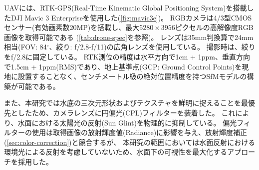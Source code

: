 UAVには、RTK-GPS(Real-Time Kinematic Global Positioning System)を搭載したDJI Mavic 3 Enterprise\cite{DJI-Mavic-3-Enterprise}を使用した(\cref{fig:mavic3e})。
RGBカメラは4/3型CMOSセンサー(有効画素数20MP)を搭載し、最大$5280 \times 3956$ピクセルの高解像度RGB画像を取得可能である
(\cref{tab:drone-spec}を参照)。
レンズは35mm判換算で24mm相当(FOV: 84$^\circ$、絞り: f/2.8-f/11)の広角レンズを使用している。
撮影時は、絞りをf/2.8に固定している。
RTK測位の精度は水平方向で1cm + 1ppm、垂直方向で1.5cm + 1ppm(RMS)であり、地上基準点(GCP: Ground Control Points)を現地に設置することなく、センチメートル級の絶対位置精度を持つSfMモデルの構築が可能である。

また、本研究では水底の三次元形状およびテクスチャを鮮明に捉えることを最優先としたため、カメラレンズに円偏光(CPL)フィルターを装着した。
これにより、水面における太陽光の反射(Sun Glint)を物理的に抑制している。
偏光フィルターの使用は取得画像の放射輝度値(Radiance)に影響を与え、放射輝度補正(\cref{sec:color-correction})と競合するが、
本研究の範囲においては水面反射における環境光による反射を考慮していないため、水面下の可視性を最大化するアプローチを採用した。


